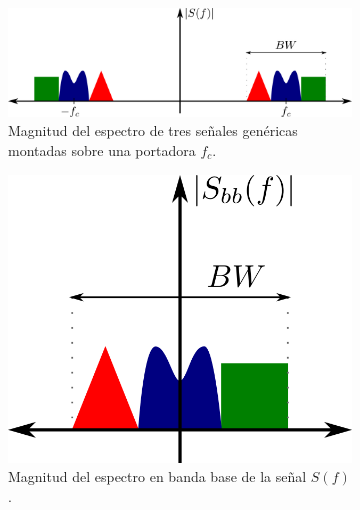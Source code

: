 \begin{figure}[ht!]
    \centering
    \begin{subfigure}[b]{0.9\textwidth}
        \centering
        \includegraphics[width=\linewidth]{images/07-GNURadio/gr_espectro_fc.png}
        \caption{Magnitud del espectro de tres señales genéricas montadas sobre una portadora $f_c$.}
        \label{fig:gr_espectro_fc}
    \end{subfigure}
    \hfill
    \begin{subfigure}[b]{0.4\textwidth}
        \centering
        \includegraphics[width=\linewidth]{images/07-GNURadio/gr_espectro_bb.png}
        \caption{Magnitud del espectro en banda base de la señal $S(f)$.}
        \label{fig:gr_espectro_bb}
    \end{subfigure}
    \caption{}
\end{figure}

